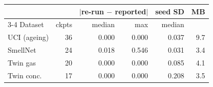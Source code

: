 \begin{tabular}{@{}lrrrrr@{}}
\toprule
 & & \multicolumn{2}{c}{$|$re-run $-$ reported$|$} & seed SD & MB \\
\cmidrule(lr){3-4}
Dataset & ckpts & median & max & median & \\
\midrule
UCI (ageing) & 36 & 0.000 & 0.000 & 0.037 & 9.7 \\
SmellNet & 24 & 0.018 & 0.546 & 0.031 & 3.4 \\
Twin gas & 20 & 0.000 & 0.000 & 0.085 & 4.1 \\
Twin conc. & 17 & 0.000 & 0.000 & 0.208 & 3.5 \\
\bottomrule
\end{tabular}
